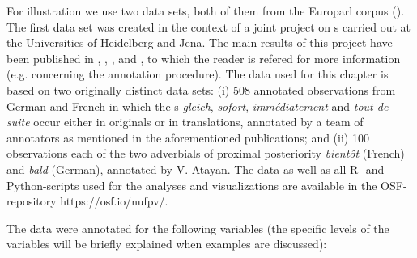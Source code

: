 For illustration we use two data sets, both of them from the Europarl corpus
(\citealt{Koehn2005,CartoniMeyer2012,Cartonietal2013}). The first data
set was created in the context of a joint project on \ipadv s carried
out at the Universities of Heidelberg and Jena. The main results of
this project have been published in \citet{Atayanetal2019},
\citet{Gastetal2019}, \citet{GastAtayan2019}, \citet{Atayan2021b} and
\citet{Atayan2021a}, to which the reader is refered for more
information (e.g. concerning the annotation procedure). The data used
for this chapter is based on two originally distinct data sets: (i)
508 annotated observations from German and French in which the \ipadv
s \textit{gleich}, \textit{sofort}, \textit{immédiatement} and
\textit{tout de suite} occur either in originals or in translations,
annotated by a team of annotators as mentioned in the aforementioned
publications;
and (ii) 100 observations each of the two adverbials of proximal
posteriority \textit{bientôt} (French) and \textit{bald} (German),
annotated by V. Atayan.  The data as well as all R- and Python-scripts
used for the analyses and visualizations are available in the
OSF-repository https://osf.io/nufpv/.

%
The data were annotated for the following variables (the specific levels of the variables will be briefly explained when examples are discussed):

